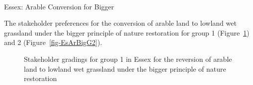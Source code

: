 \documentclass[
  12pt,
  letterpaper,
  DIV=11,
  numbers=noendperiod]{scrartcl}
\makeatletter
\let\oldparagraph\paragraph
\renewcommand{\paragraph}{
    \@ifstar
      \xxxParagraphStar
      \xxxParagraphNoStar
  }
\newcommand{\xxxParagraphStar}[1]{\oldparagraph*{#1}\mbox{}}
\newcommand{\xxxParagraphNoStar}[1]{\oldparagraph{#1}\mbox{}}
\makeatother
\begin{document}
\newpage{}

\paragraph{Essex: Arable Conversion for
Bigger}\label{essex-arable-conversion-for-bigger}

The stakeholder preferences for the conversion of arable land to lowland
wet grassland under the bigger principle of nature restoration for group
1 (Figure~\ref{fig-EsArBigG1}) and 2 (Figure~\ref{fig-EsArBigG2}).

\begin{figure}[H]


\caption{\label{fig-EsArBigG1}Stakeholder gradings for group 1 in Essex
for the reversion of arable land to lowland wet grassland under the
bigger principle of nature restoration}

\end{figure}%
\end{document}
